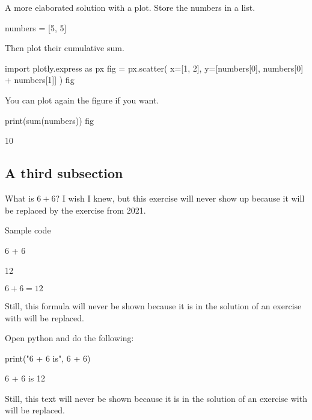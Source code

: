 \documentclass{book}
\begin{document}
\begin{additionalinformation}
A more elaborated solution with a plot. Store the numbers in a list.

\begin{pycell}
numbers = [5, 5]
\end{pycell}

Then plot their cumulative sum.

\begin{pycell}
import plotly.express as px
fig = px.scatter(
    x=[1, 2],
    y=[numbers[0], numbers[0] + numbers[1]]
)
fig
\end{pycell}

\newpage

You can plot again the figure if you want.

\begin{pycell}
print(sum(numbers))
fig
\end{pycell}
\begin{pyexpectedoutput}
10
\end{pyexpectedoutput}
\end{additionalinformation}

\subsection{A third subsection}

\begin{exercise}[examdate={January 16, 2020}, examproblemnumber={1}, examproblemid={2020-01-16-01}, replacedbyexamproblemid={2021-01-16-01}, replacementsinceacademicyear={2025/2026}]
  What is \(6 + 6\)? I wish I knew, but this exercise will never show up because it will be replaced by the exercise from 2021.

Sample code
\begin{pycell}
6 + 6
\end{pycell}
\begin{pyexpectedoutput}
12
\end{pyexpectedoutput}
\end{exercise}

\begin{solution}
  \(6 + 6 = 12\)

Still, this formula will never be shown because it is in the solution of an exercise with will be replaced.
\end{solution}

\begin{additionalinformation}
Open python and do the following:

\begin{pycell}
print("6 + 6 is", 6 + 6)
\end{pycell}
\begin{pyexpectedoutput}
6 + 6 is 12
\end{pyexpectedoutput}

Still, this text will never be shown because it is in the solution of an exercise with will be replaced.
\end{additionalinformation}
\end{document}
